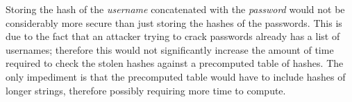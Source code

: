 \documentclass[../CryptoHW3.tex]{subfiles}
\begin{document}
\begin{flushleft}



 Storing the hash of the \emph{username} concatenated with the \emph{password} would not be considerably more secure than just storing the hashes of the passwords.  This is due to the fact that an attacker trying to crack passwords already has a list of usernames; therefore this would not significantly increase the amount of time required to check the stolen hashes against a precomputed table of hashes.  The only impediment is that the precomputed table would have to include hashes of longer strings, therefore possibly requiring more time to compute.






\end{flushleft}
\end{document}
